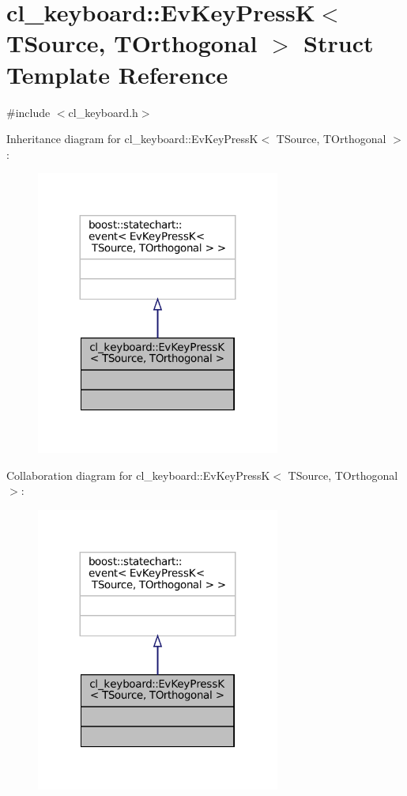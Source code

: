 \hypertarget{structcl__keyboard_1_1EvKeyPressK}{}\section{cl\+\_\+keyboard\+:\+:Ev\+Key\+PressK$<$ T\+Source, T\+Orthogonal $>$ Struct Template Reference}
\label{structcl__keyboard_1_1EvKeyPressK}


{\ttfamily \#include $<$cl\+\_\+keyboard.\+h$>$}



Inheritance diagram for cl\+\_\+keyboard\+:\+:Ev\+Key\+PressK$<$ T\+Source, T\+Orthogonal $>$\+:
\nopagebreak
\begin{figure}[H]
\begin{center}
\leavevmode
\includegraphics[width=227pt]{structcl__keyboard_1_1EvKeyPressK__inherit__graph}
\end{center}
\end{figure}


Collaboration diagram for cl\+\_\+keyboard\+:\+:Ev\+Key\+PressK$<$ T\+Source, T\+Orthogonal $>$\+:
\nopagebreak
\begin{figure}[H]
\begin{center}
\leavevmode
\includegraphics[width=227pt]{structcl__keyboard_1_1EvKeyPressK__coll__graph}
\end{center}
\end{figure}


